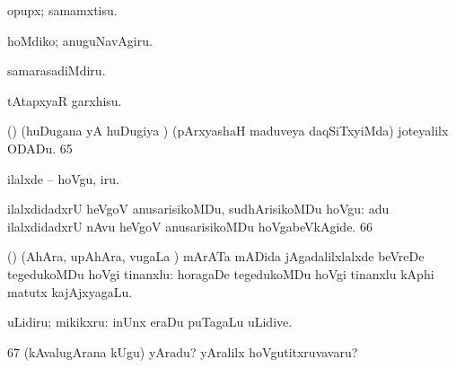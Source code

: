 {{ opupx; samamxtisu. 

 hoMdiko; anuguNavAgiru. 

 samarasadiMdiru. 

 tAtapxyaR garxhisu. 

 (\AmA) (huDugana yA huDugiya \vi) (pArxyashaH maduveya daqSiTxyiMda) joteyalilx ODADu. 
\num{65}  

 ilalxde -- hoVgu, iru. 

 ilalxdidadxrU heVgoV anusarisikoMDu, sudhArisikoMDu hoVgu:  adu ilalxdidadxrU
nAvu heVgoV anusarisikoMDu hoVgabeVkAgide. 
\num{66}  

 (\ame) (AhAra, upAhAra, \mo vugaLa \vi) mArATa mADida
jAgadalilxlalxde beVreDe tegedukoMDu hoVgi tinanxlu:  horagaDe tegedukoMDu hoVgi tinanxlu kAphi matutx
kajAjxyagaLu. 

 uLidiru; mikikxru:  inUnx eraDu puTagaLu uLidive. 
\num{67} 
(kAvalugArana kUgu) yAradu? yAralilx hoVgutitxruvavaru?}}


